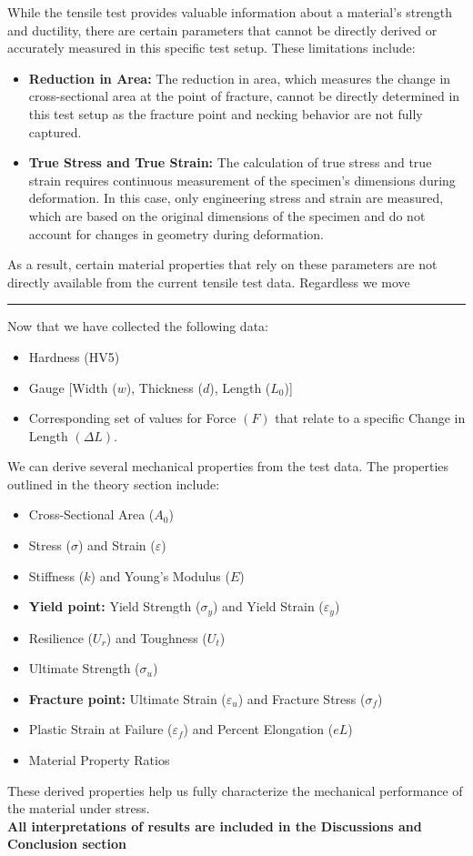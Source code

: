 \documentclass{article}
\begin{document}
    While the tensile test provides valuable information about a material's strength and ductility, there are certain parameters that cannot be directly derived or accurately measured in this specific test setup. These limitations include:
    \begin{itemize}[left=0pt, itemsep=-1mm]
        \item \textbf{Reduction in Area:} The reduction in area, which measures the change in cross-sectional area at the point of fracture, cannot be directly determined in this test setup as the fracture point and necking behavior are not fully captured.
        \item \textbf{True Stress and True Strain:} The calculation of true stress and true strain requires continuous measurement of the specimen's dimensions during deformation. In this case, only engineering stress and strain are measured, which are based on the original dimensions of the specimen and do not account for changes in geometry during deformation.
    \end{itemize}
    As a result, certain material properties that rely on these parameters are not directly available from the current tensile test data. Regardless we move\\
    \vspace{1em}
    \hrule
    \vspace{1em}
    Now that we have collected the following data:
    \begin{itemize}
        \item Hardness (HV5)
        \item Gauge [Width (\(w\)), Thickness (\(d\)), Length (\(L_0\))]
        \item Corresponding set of values for Force \((F)\) that relate to a specific Change in Length \((\Delta L)\).
    \end{itemize}
    We can derive several mechanical properties from the test data. The properties outlined in the theory section include:
    \begin{itemize}
        \item Cross-Sectional Area ($A_0$)
        \item Stress ($\sigma$) and Strain ($\varepsilon$)
        \item Stiffness ($k$) and Young's Modulus ($E$)
        \item \textbf{Yield point:} Yield Strength ($\sigma_y$) and Yield Strain ($\varepsilon_y$)
        \item Resilience ($U_r$) and Toughness ($U_t$)
        \item Ultimate Strength ($\sigma_u$)
        \item \textbf{Fracture point:} Ultimate Strain ($\varepsilon_u$) and Fracture Stress ($\sigma_f$)
        \item Plastic Strain at Failure ($\varepsilon_f$) and Percent Elongation ($eL$)  
        \item Material Property Ratios
    \end{itemize}
    These derived properties help us fully characterize the mechanical performance of the material under stress.\\
    \textbf{All interpretations of results are included in the Discussions and Conclusion section}
    \newpage
\end{document}
